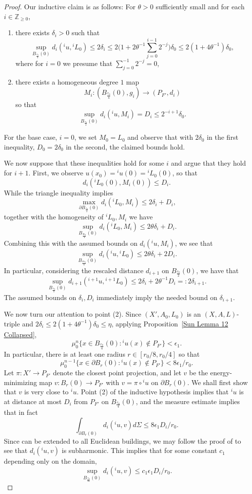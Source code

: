 \documentclass[12pt]{amsart}
\theoremstyle{definition}
\numberwithin{equation}{section}
\begin{document}
\begin{proof}
Our inductive claim is as follows:
\noindent For $\theta>0$ sufficiently small and for each $i \in \mathbb Z_{\geq 0}$, 
\begin{enumerate}
\item there exists $\delta_i>0$ such that $$\sup_{B_{\frac{r_0}4}(0)}d_i({^iu},{^iL}_0)\leq 2 \delta_i\leq 2\Big(1+2\theta^{-1}\sum_{j=0}^{i-1}2^{-j}\Big)\delta_0\leq 2(1+4\theta^{-1})\delta_0,$$where for $i=0$ we presume that $\sum_{j=0}^{-1}2^{-j}=0$, 
\item there exists a homogeneous degree $1$ map \[M_i:(B_{\frac{r_0}4}(0),g_i)\to (P_{F'}, d_i)\] so that \[\sup_{B_{\frac{r_0}4}(0)}d_i({^iu},M_i)=D_i\leq2^{-i+1}\delta_0.\]
\end{enumerate}
For the base case, $i=0$, we set $M_0=L_0$ and observe that with $2\delta_0$ in the first inequality, $D_0=2\delta_0$ in the second, the claimed bounds hold.

We now suppose that these inequalities hold for some $i$ and argue that they hold for $i+1$. First, we observe $u(x_0)={^iu}(0)={^iL}_0(0)$, so that
\[
d_i({^iL}_0(0),M_i(0))\leq D_i.
\]
While the triangle inequality implies
\[
\max_{\partial B_{\frac{r_0}4}(0)} d_i({^iL}_0,M_i)\leq 2\delta_i+D_i,
\]
together with the homogeneity of ${^iL}_0,M_i$ we have
\[
\sup_{B_{\frac{\theta r_0}4}(0)}d_i({^iL}_0,M_i)\leq 2\theta \delta_i+D_i.
\]
Combining this with the assumed bounds on $d_i({^i}u,M_i)$, we see that
\[
\sup_{B_{\frac{\theta r_0}4}(0)} d_i({^iu},{^iL}_0)\leq 2\theta\delta_i+2D_i.
\]
In particular, considering the rescaled distance $d_{i+1}$ on $B_{\frac{r_0}2}(0)$, we have that
\[
\sup_{B_{\frac{r_0}4}(0)}d_{i+1}({^{i+1}u},{^{i+1}L}_0)\leq 2\delta_i+2\theta^{-1}D_i=:2 \delta_{i+1}.
\]
The assumed bounds on $\delta_i,D_i$ immediately imply the needed bound on $\delta_{i+1}$.

We now turn our attention to point (2). 
Since $(X',A_0, L_0)$ is an $(X,A,L)$-triple
and $2\delta_i \leq 2(1+4\theta^{-1})\delta_0\leq\eta$, applying Proposition~\ref{Sun Lemma 12 Collapsed}, 
\[
\mu_0^n\{x\in B_{\frac {r_0}{4}}(0):{^iu}(x)\notin P_{F'}\}<\epsilon_1.
\]
In particular, there is at least one radius $r\in[r_0/8, r_0/4]$ so that
\[
\mu_0^{n-1}\{x\in\partial B_r(0):{^iu}(x)\notin P_{F'}\}<8\epsilon_1/r_0.
\]
Let $\pi:X' \to P_{F'}$ denote the closest point projection, and let $v$ be the energy-minimizing map $v:B_r(0)\to P_{F'}$ with $v=\pi\circ{^iu}$ on $\partial B_r(0)$.  We shall first show that $v$ is very close to ${^iu}$.  Point (2) of the inductive hypothesis implies that ${^iu}$ is at distance at most $D_i$ from $P_{F'}$ on $B_{\frac{r_0}4}(0)$, and the measure estimate implies that in fact
\[
\int_{\partial B_r(0)}d_i({^iu},v)d\Sigma\leq8\epsilon_1D_i/r_0.
\]
Since \cite[Equation (2.2)]{gromov-schoen} can be extended to all Euclidean buildings, we may follow the proof of \cite[Lemma 5.3]{gromov-schoen} to see that $d_i({^iu},v)$ is subharmonic. This implies that for some constant $c_1$ depending only on the domain,
\begin{equation}\label{eq:subharm}
\sup_{B_{\frac{r_0}{16}}(0)}d_i({^iu},v)\leq c_1\epsilon_1D_i/r_0.
\end{equation}


\end{proof}
\end{document}

